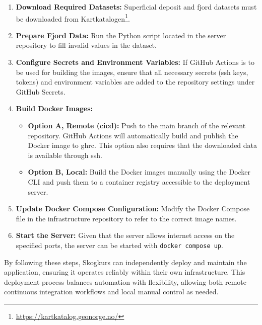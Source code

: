 \begin{enumerate}
    \item \textbf{Download Required Datasets:} Superficial deposit and fjord datasets must be downloaded from Kartkatalogen\footnote{\url{https://kartkatalog.geonorge.no/}}.

    \item \textbf{Prepare Fjord Data:} Run the Python script located in the server repository to fill invalid values in the dataset.

    \item \textbf{Configure Secrets and Environment Variables:} If GitHub Actions is to be used for building the images, ensure that all necessary secrets (\acrshort{ssh} keys, tokens) and environment variables are added to the repository settings under GitHub Secrets.

    \item \textbf{Build Docker Images:}  
    \begin{itemize}
        \item \textbf{Option A, Remote (\acrshort{cicd}):} Push to the main branch of the relevant repository. GitHub Actions will automatically build and publish the Docker image to \acrshort{ghrc}. This option also requires that the downloaded data is available through \acrshort{ssh}.
        \item \textbf{Option B, Local:} Build the Docker images manually using the Docker CLI and push them to a container registry accessible to the deployment server.
    \end{itemize}

    \item \textbf{Update Docker Compose Configuration:} Modify the Docker Compose file in the infrastructure repository to refer to the correct image names.

    \item \textbf{Start the Server:} Given that the server allows internet access on the specified ports, the server can be started with \texttt{docker compose up}.
\end{enumerate}

By following these steps, Skogkurs can independently deploy and maintain the application, ensuring it operates reliably within their own infrastructure. This deployment process balances automation with flexibility, allowing both remote continuous integration workflows and local manual control as needed.
